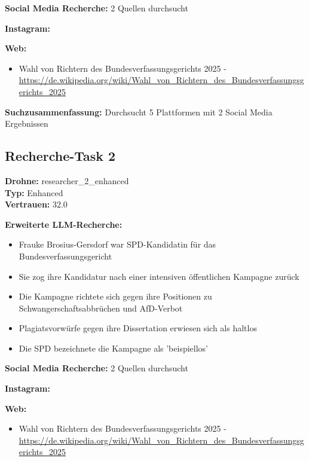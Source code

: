 \documentclass[12pt,a4paper]{article}
\begin{document}
\textbf{Social Media Recherche:} 2 Quellen durchsucht

\textbf{Instagram:}
\begin{itemize}
\end{itemize}

\textbf{Web:}
\begin{itemize}
\item Wahl von Richtern des Bundesverfassungsgerichts 2025 - \url{https://de.wikipedia.org/wiki/Wahl_von_Richtern_des_Bundesverfassungsgerichts_2025}
\end{itemize}

\textbf{Suchzusammenfassung:} Durchsucht 5 Plattformen mit 2 Social Media Ergebnissen

\subsection{Recherche-Task 2}

\textbf{Drohne:} researcher\_2\_enhanced\\
\textbf{Typ:} Enhanced\\
\textbf{Vertrauen:} 32.0%

\textbf{Erweiterte LLM-Recherche:}
\begin{itemize}
\item Frauke Brosius-Gersdorf war SPD-Kandidatin für das Bundesverfassungsgericht
\item Sie zog ihre Kandidatur nach einer intensiven öffentlichen Kampagne zurück
\item Die Kampagne richtete sich gegen ihre Positionen zu Schwangerschaftsabbrüchen und AfD-Verbot
\item Plagiatsvorwürfe gegen ihre Dissertation erwiesen sich als haltlos
\item Die SPD bezeichnete die Kampagne als 'beispiellos'
\end{itemize}

\textbf{Social Media Recherche:} 2 Quellen durchsucht

\textbf{Instagram:}
\begin{itemize}
\end{itemize}

\textbf{Web:}
\begin{itemize}
\item Wahl von Richtern des Bundesverfassungsgerichts 2025 - \url{https://de.wikipedia.org/wiki/Wahl_von_Richtern_des_Bundesverfassungsgerichts_2025}
\end{itemize}
\end{document}
